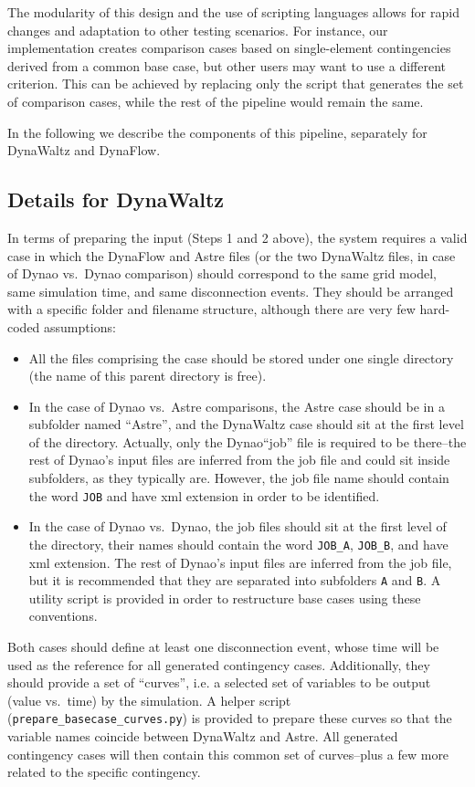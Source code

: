 \documentclass[conference]{IEEEtran}
\newcommand{\Dynawo}{Dyna\textomega o\xspace} %
\newcommand{\code}[1]{\texttt{#1}}
\begin{document}
The modularity of this design and the use of scripting languages
allows for rapid changes and adaptation to other testing
scenarios. For instance, our implementation creates comparison cases
based on single-element contingencies derived from a common base case,
but other users may want to use a different criterion. This can be
achieved by replacing only the script that generates the set of
comparison cases, while the rest of the pipeline would remain the
same.

In the following we describe the components of this pipeline, separately
for DynaWaltz and DynaFlow.


\subsection{Details for DynaWaltz}

In terms of preparing the input (Steps 1 and 2 above), the system requires a
valid case in which the DynaFlow and Astre files (or the two DynaWaltz files, in
case of \Dynawo vs.\ \Dynawo comparison) should correspond to the same grid
model, same simulation time, and same disconnection events.  They should be
arranged with a specific folder and filename structure, although there are very
few hard-coded assumptions:
\begin{itemize}
\item All the files comprising the case should be stored under one
  single directory (the name of this parent directory is free).
\item In the case of \Dynawo vs.\ Astre comparisons, the Astre case
  should be in a subfolder named ``Astre'', and the DynaWaltz case
  should sit at the first level of the directory. Actually, only the
  \Dynawo ``job'' file is required to be there--the rest of \Dynawo's
  input files are inferred from the job file and could sit inside
  subfolders, as they typically are.  However, the job file name
  should contain the word \code{JOB} and have xml extension in order
  to be identified.
\item In the case of \Dynawo vs.\ \Dynawo, the job files should sit at
  the first level of the directory, their names should contain the
  word \code{JOB\_A}, \code{JOB\_B}, and have xml extension. The rest
  of \Dynawo's input files are inferred from the job file, but it is
  recommended that they are separated into subfolders \code{A} and
  \code{B}. A utility script is provided in order to restructure base
  cases using these conventions.
\end{itemize}
Both cases should define at least one disconnection event, whose time will be
used as the reference for all generated contingency cases.  Additionally, they
should provide a set of ``curves'', i.e. a selected set of variables to be
output (value vs.\ time) by the simulation. A helper script
(\code{prepare\_basecase\_curves.py}) is provided to prepare these curves so that
the variable names coincide between DynaWaltz and Astre. All generated
contingency cases will then contain this common set of curves--plus a few more
related to the specific contingency.
\end{document}

